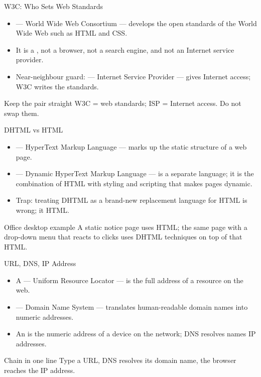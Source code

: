 \documentclass[aspectratio=169]{beamer}
\begin{document}
\begin{frame}{W3C: Who Sets Web Standards}
  \begin{itemize}
    \item {} --- World Wide Web Consortium --- develops the open
      standards of the World Wide Web such as HTML and CSS.
    \item It is a , not a browser, not a search engine,
      and not an Internet service provider.
    \item Near-neighbour guard:  --- Internet Service Provider ---
      gives Internet access; W3C writes the standards.
  \end{itemize}
  \begin{block}{Keep the pair straight}
    W3C = web standards; ISP = Internet access. Do not swap them.
  \end{block}
\end{frame}

\begin{frame}{DHTML vs HTML}
  \begin{itemize}
    \item {} --- HyperText Markup Language --- marks up the static
      structure of a web page.
    \item {} --- Dynamic HyperText Markup Language --- is
       a separate language; it is the combination of HTML with
      styling and scripting that makes pages dynamic.
    \item Trap: treating DHTML as a brand-new replacement language for HTML
      is wrong; it  HTML.
  \end{itemize}
  \begin{exampleblock}{Office desktop example}
    A static notice page uses HTML; the same page with a drop-down menu that
    reacts to clicks uses DHTML techniques on top of that HTML.
  \end{exampleblock}
\end{frame}

\begin{frame}{URL, DNS, IP Address}
  \begin{itemize}
    \item A  --- Uniform Resource Locator --- is the full address of
      a resource on the web.
    \item {} --- Domain Name System --- translates human-readable
      domain names into numeric addresses.
    \item An  is the numeric address of a device on the
      network; DNS resolves names  IP addresses.
  \end{itemize}
  \begin{block}{Chain in one line}
    Type a URL, DNS resolves its domain name, the browser reaches the IP
    address.
  \end{block}
\end{frame}
\end{document}
